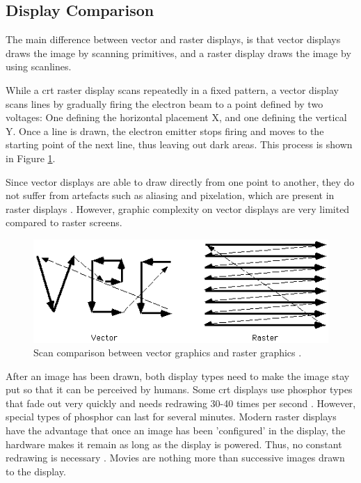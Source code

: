 \subsection{Display Comparison}
The main difference between vector and raster displays, is that vector displays draws the image by scanning primitives, and a raster display draws the image by using scanlines.

While a \gls{crt} raster display scans repeatedly in a fixed pattern, a vector display scans lines by gradually firing the electron beam to a point defined by two voltages: One defining the horizontal placement X, and one defining the vertical Y.
Once a line is drawn, the electron emitter stops firing and moves to the starting point of the next line, thus leaving out dark areas.
This process is shown in Figure \ref{fig:vectorscan}.

Since vector displays are able to draw directly from one point to another, they do not suffer from artefacts such as aliasing and pixelation, which are present in raster displays \cite{vector-monitor}.
However, graphic complexity on vector displays are very limited compared to raster screens.

\begin{figure}[h!]
\centering \includegraphics[width=0.9\linewidth]{images/scan.png}
\caption{Scan comparison between vector graphics and raster graphics \cite{vecvsras}.}
\label{fig:vectorscan}
\end{figure}

After an image has been drawn, both display types need to make the image stay put so that it can be perceived by humans.
Some \gls{crt} displays use phosphor types that fade out very quickly and needs redrawing 30-40 times per second \cite{vector-monitor}.
However, special types of phosphor can last for several minutes.
Modern raster displays have the advantage that once an image has been 'configured' in the display, the hardware makes it remain as long as the display is powered.
Thus, no constant redrawing is necessary \cite{LCD-persistence}.
Movies are nothing more than successive images drawn to the display.

